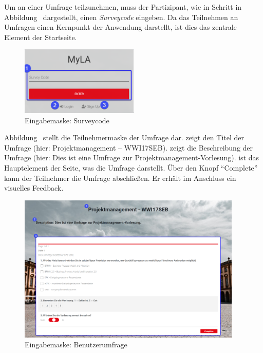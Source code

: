 Um an einer Umfrage teilzunehmen, muss der Partizipant, wie in Schritt \desOne in Abbildung~ dargestellt, einen \emph{Surveycode} eingeben.
Da das Teilnehmen an Umfragen einen Kernpunkt der Anwendung darstellt, ist dies das zentrale Element der Startseite.

\begin{figure}[H]
	\centering
	\includegraphics[width=0.5\textwidth, keepaspectratio]{img/guide/SurveyCode.png}
	\captionsetup{justification=centering, format=plain}
	\caption[Eingabemaske: Surveycode]{Eingabemaske: Surveycode \\\quelleScreenshot}
	\label{fig:EingabemaskeSurveycode}
\end{figure}

Abbildung~ stellt die Teilnehmermaske der Umfrage dar.
\desOne zeigt den Titel der Umfrage (hier: Projektmanagement -- WWI17SEB).
\desTwo zeigt die Beschreibung der Umfrage (hier: Dies ist eine Umfrage zur Projektmanagement-Vorlesung).
\desThree ist das Hauptelement der Seite, was die Umfrage darstellt.
Über den Knopf \enquote{Complete} kann der Teilnehmer die Umfrage abschließen.
Er erhält im Anschluss ein visuelles Feedback.
%
\begin{figure}[H]
	\centering
	\includegraphics[width=0.95\textwidth, keepaspectratio]{img/guide/SurveyParticipate.png}
	\captionsetup{justification=centering, format=plain}
	\caption[Eingabemaske: Benutzerumfrage]{Eingabemaske: Benutzerumfrage \\\quelleScreenshot}
	\label{fig:Teilnehmermaske}
\end{figure}
%
